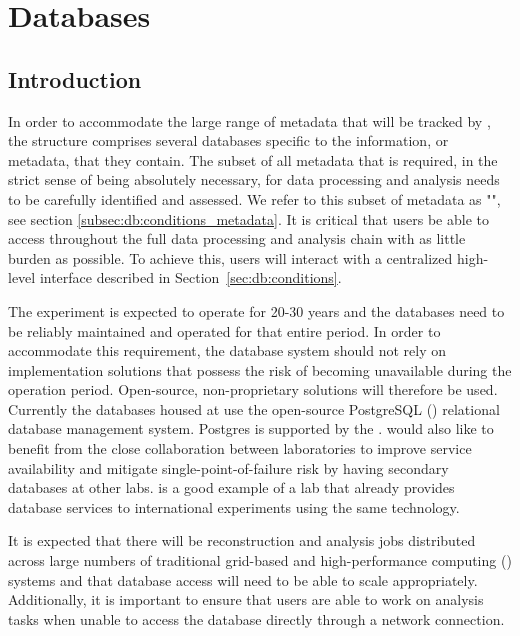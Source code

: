 \documentclass[../main-v1.tex]{subfiles}
\begin{document}
\chapter{Databases }
\label{ch:db}

\section{Introduction   }
\label{sec:db:intro} 

In order to accommodate the large range of metadata that will be tracked by , the   structure comprises several databases specific to the information, or metadata, that they contain. 
The subset of all  metadata that is required, in the strict sense of being absolutely necessary, for data processing and analysis needs to be carefully identified and assessed.  We refer to this subset of metadata as "", see section \ref{subsec:db:conditions_metadata}.
It is critical that users be able to access  throughout the full data processing and analysis chain with as little burden as possible. To achieve this, users will interact with a centralized high-level interface   described in Section~\ref{sec:db:conditions}.

The  experiment is expected to operate for 20-30 years and the  databases need to be reliably maintained and operated for that entire period. In order to accommodate this requirement, the database system should not rely on implementation solutions that possess the risk of becoming unavailable during the operation period. Open-source, non-proprietary solutions will therefore be used. Currently the databases housed at  use the open-source PostgreSQL () relational database management system. Postgres is supported by the .       
 would also like to benefit from the close collaboration between  laboratories to improve service availability and mitigate single-point-of-failure risk by having secondary databases at other  labs.   is a good example of a lab that already provides database services to international experiments using the same  technology.

It is expected that there will be reconstruction and analysis jobs distributed across large numbers of traditional grid-based and high-performance computing () systems and that database access will need to be able to scale appropriately. Additionally, it is important to ensure that users are able to work on analysis tasks when unable to access the database directly through a network connection. 
\end{document}
